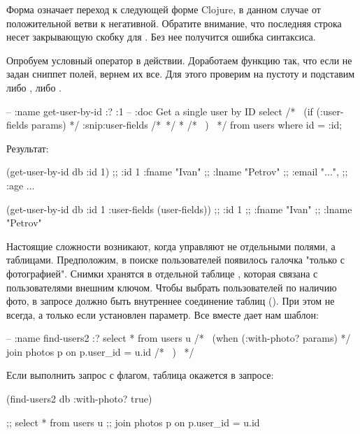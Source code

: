 Форма \code{/*~*/} означает переход к следующей форме Clojure, в данном случае от положительной ветви  к негативной. Обратите внимание, что последняя строка несет закрывающую скобку для . Без нее получится ошибка синтаксиса.

Опробуем условный оператор в действии. Доработаем функцию  так, что если не задан сниппет полей, вернем их все. Для этого проверим  на пустоту и подставим либо , либо \code{*}.

\begin{english}
  \begin{sql}
-- :name get-user-by-id :? :1
-- :doc Get a single user by ID
select
/*~ (if (:user-fields params) */
:snip:user-fields
/*~*/
*
/*~ ) ~*/
from users
where id = :id;
  \end{sql}
\end{english}

Результат:

\begin{english}
  \begin{clojure}
(get-user-by-id db {:id 1})
;; {:id 1 :fname "Ivan"
;; :lname "Petrov"
;; :email "...",
;; :age ...}

(get-user-by-id db {:id 1 :user-fields (user-fields)})
;; {:id 1
;;  :fname "Ivan"
;;  :lname "Petrov"}
  \end{clojure}
\end{english}

Настоящие сложности возникают, когда управляют не отдельными полями, а таблицами. Предположим, в поиске пользователей появилось галочка "только с фотографией". Снимки хранятся в отдельной таблице , которая связана с пользователями внешним ключом. Чтобы выбрать пользователей по наличию фото, в запросе должно быть внутреннее соединение таблиц (). При этом не всегда, а только если установлен параметр. Все вместе дает нам шаблон:

\begin{english}
  \begin{sql}
-- :name find-users2 :?
select * from users u
/*~ (when (:with-photo? params) */
join photos p on p.user_id = u.id
/*~ ) ~*/
  \end{sql}
\end{english}

Если выполнить запрос с флагом, таблица  окажется в запросе:

\begin{english}
  \begin{clojure}
(find-users2 db {:with-photo? true})

;; select * from users u
;; join photos p on p.user_id = u.id
  \end{clojure}
\end{english}


